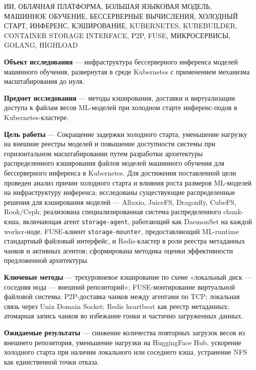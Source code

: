 \abstract

\begingroup
\renewcommand\keywords[1]{\indent #1}
\keywords{ИИ, ОБЛАЧНАЯ ПЛАТФОРМА, БОЛЬШАЯ ЯЗЫКОВАЯ МОДЕЛЬ, МАШИННОЕ ОБУЧЕНИЕ, БЕССЕРВЕРНЫЕ ВЫЧИСЛЕНИЯ, ХОЛОДНЫЙ СТАРТ, ИНФЕРЕНС, КЭШИРОВАНИЕ, KUBERNETES, KUBEBUILDER, CONTAINER STORAGE INTERFACE, P2P, FUSE, МИКРОСЕРВИСЫ, GOLANG, HIGHLOAD}
\endgroup

\textbf{Объект исследования} --- инфраструктура бессерверного инференса моделей машинного обучения, развернутая в среде Kubernetes с применением механизма масштабирования до нуля.

\textbf{Предмет исследования} --- методы кэширования, доставки и виртуализации доступа к файлам весов ML-моделей при холодном старте инференс-подов в Kubernetes-кластере.

\textbf{Цель работы} --- Сокращение задержки холодного старта, уменьшение нагрузку на внешние реестры моделей и повышение доступности системы при горизонтальном масштабировании путем разработки архитектуры распределенного кэширования файлов моделей машинного обучения для бессерверного инференса в Kubernetes.
Для достижения поставленной цели проведен анализ причин холодного старта и влияния роста размеров ML-моделей на инфраструктуру инференса; исследованы существующие распределенные решения для кэширования моделей --- Alluxio, JuiceFS, Dragonfly, CubeFS, Rook/Ceph; реализована специализированная система распределенного chunk-кэша, включающая агент \texttt{storage-agent}, работающий как DaemonSet на каждой worker-ноде, FUSE-клиент \texttt{storage-mounter}, предоставляющий ML-runtime стандартный файловый интерфейс, и Redis-кластер в роли реестра метаданных чанков и активных агентов; сформирована методика оценки эффективности предложенной архитектуры.

\textbf{Ключевые методы} --- трехуровневое кэширование по схеме «локальный диск --- соседняя нода --- внешний репозиторий»; FUSE-монтирование виртуальной файловой системы; P2P-доставка чанков между агентами по TCP; локальная связь через Unix Domain Socket; Redis heartbeat как реестр метаданных; атомарная запись чанков во избежание гонки и частично загруженных данных.

\textbf{Ожидаемые результаты} --- снижение количества повторных загрузок весов из внешнего репозитория, уменьшение нагрузки на HuggingFace Hub, ускорение холодного старта при наличии локального или соседнего кэша, устранение NFS как единственной точки отказа.
